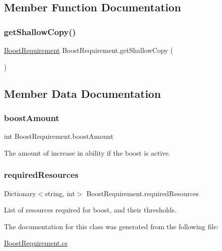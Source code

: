\subsection{Member Function Documentation}
\mbox{\label{class_boost_requirement_aebc683969c2561e56a2b45d98d54876d}} 
\subsubsection{\texorpdfstring{get\+Shallow\+Copy()}{getShallowCopy()}}
{\footnotesize\ttfamily \mbox{\hyperlink{class_boost_requirement}{Boost\+Requirement}} Boost\+Requirement.\+get\+Shallow\+Copy (\begin{DoxyParamCaption}{ }\end{DoxyParamCaption})}



\subsection{Member Data Documentation}
\mbox{\label{class_boost_requirement_ace675651f02aff4a40aecc2ab40d4822}} 
\subsubsection{\texorpdfstring{boost\+Amount}{boostAmount}}
{\footnotesize\ttfamily int Boost\+Requirement.\+boost\+Amount}



The amount of increase in ability if the boost is active. 

\mbox{\label{class_boost_requirement_ad0415c1e37d462bffcf3c3e4dbf69eed}} 
\subsubsection{\texorpdfstring{required\+Resources}{requiredResources}}
{\footnotesize\ttfamily Dictionary$<$string, int$>$ Boost\+Requirement.\+required\+Resources}



List of resources required for boost, and their thresholds. 



The documentation for this class was generated from the following file\+:\begin{DoxyCompactItemize}
\item 
\mbox{\hyperlink{_boost_requirement_8cs}{Boost\+Requirement.\+cs}}\end{DoxyCompactItemize}
